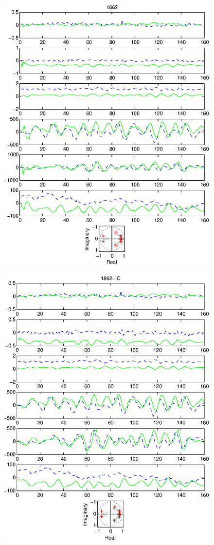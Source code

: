 \documentclass{article}
\begin{document}
\begin{figure}[htb!]\centering
\includegraphics{1862.eps}
\end{figure}\clearpage
\begin{figure}[htb!]\centering
\includegraphics{1862_ic.eps}
\end{figure}\clearpage
\end{document}

